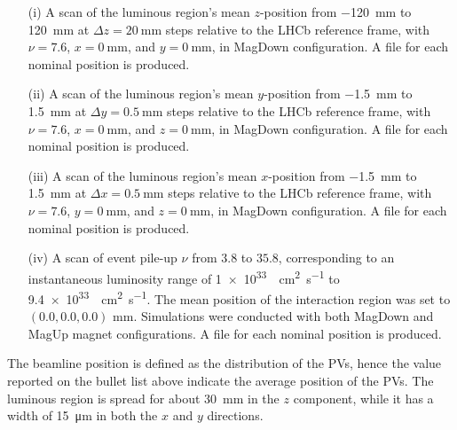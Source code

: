 \begin{enumerate}

    \item[(i)] A scan of the luminous region's mean $z$-position from \SI{-120}{\milli\meter} to \SI{120}{\milli\meter} at $\Delta z=\SI{20}{\milli\meter}$ steps relative to the LHCb reference frame, with $\nu = 7.6$, $x = \SI{0}{\milli\meter}$, and $y = \SI{0}{\milli\meter}$, in MagDown configuration. A file for each nominal position is produced.

    \item[(ii)] A scan of the luminous region's mean $y$-position from \SI{-1.5}{\milli\meter} to \SI{1.5}{\milli\meter} at $\Delta y =\SI{0.5}{\milli\meter}$ steps relative to the LHCb reference frame, with $\nu = 7.6$, $x = \SI{0}{\milli\meter}$, and $z = \SI{0}{\milli\meter}$, in MagDown configuration. A file for each nominal position is produced.

     \item[(iii)] A scan of the luminous region's mean $x$-position from \SI{-1.5}{\milli\meter} to \SI{1.5}{\milli\meter} at $\Delta x =\SI{0.5}{\milli\meter}$ steps relative to the LHCb reference frame, with $\nu = 7.6$, $y = \SI{0}{\milli\meter}$, and $z = \SI{0}{\milli\meter}$, in MagDown configuration. A file for each nominal position is produced.

     \item[(iv)] A scan of event pile-up \(\nu\) from $3.8$ to $35.8$, corresponding to an instantaneous luminosity range of \SI{1e33}{\per\centi\meter\squared\per\second} to \SI{9.4e33}{\per\centi\meter\squared\per\second}. The mean position of the interaction region was set to $(0.0, 0.0, 0.0)$ mm. Simulations were conducted with both MagDown and MagUp magnet configurations. A file for each nominal position is produced.

\end{enumerate}


The beamline position is defined as the distribution of the PVs, hence the value reported on the bullet list above indicate the average position of the PVs. The luminous region is spread for about \SI{30}{\milli\meter} in the $z$ component, while it has a width of \SI{15}{\micro\meter} in both the $x$ and $y$ directions.  

